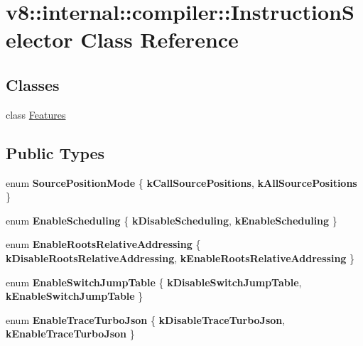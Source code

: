\hypertarget{classv8_1_1internal_1_1compiler_1_1InstructionSelector}{}\section{v8\+:\+:internal\+:\+:compiler\+:\+:Instruction\+Selector Class Reference}
\label{classv8_1_1internal_1_1compiler_1_1InstructionSelector}
\subsection*{Classes}
\begin{DoxyCompactItemize}
\item 
class \mbox{\hyperlink{classv8_1_1internal_1_1compiler_1_1InstructionSelector_1_1Features}{Features}}
\end{DoxyCompactItemize}
\subsection*{Public Types}
\begin{DoxyCompactItemize}
\item 
\mbox{\label{classv8_1_1internal_1_1compiler_1_1InstructionSelector_ac985d7ff7e0eeb569c3b612182388601}} 
enum {\bfseries Source\+Position\+Mode} \{ {\bfseries k\+Call\+Source\+Positions}, 
{\bfseries k\+All\+Source\+Positions}
 \}
\item 
\mbox{\label{classv8_1_1internal_1_1compiler_1_1InstructionSelector_a620ee41970e195d622cd14d75be35fa1}} 
enum {\bfseries Enable\+Scheduling} \{ {\bfseries k\+Disable\+Scheduling}, 
{\bfseries k\+Enable\+Scheduling}
 \}
\item 
\mbox{\label{classv8_1_1internal_1_1compiler_1_1InstructionSelector_a78a3e6dbeed07a605df0e9c477fe58f1}} 
enum {\bfseries Enable\+Roots\+Relative\+Addressing} \{ {\bfseries k\+Disable\+Roots\+Relative\+Addressing}, 
{\bfseries k\+Enable\+Roots\+Relative\+Addressing}
 \}
\item 
\mbox{\label{classv8_1_1internal_1_1compiler_1_1InstructionSelector_a9ce7b9b688dc248982b7a18c1badc248}} 
enum {\bfseries Enable\+Switch\+Jump\+Table} \{ {\bfseries k\+Disable\+Switch\+Jump\+Table}, 
{\bfseries k\+Enable\+Switch\+Jump\+Table}
 \}
\item 
\mbox{\label{classv8_1_1internal_1_1compiler_1_1InstructionSelector_a5b97a140f30c5b3fa50b7da887270004}} 
enum {\bfseries Enable\+Trace\+Turbo\+Json} \{ {\bfseries k\+Disable\+Trace\+Turbo\+Json}, 
{\bfseries k\+Enable\+Trace\+Turbo\+Json}
 \}
\end{DoxyCompactItemize}
